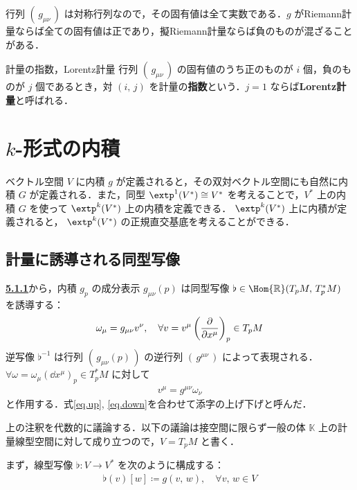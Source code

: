 \documentclass[geometry_main]{subfiles}
\begin{document}
行列 $(\, g_{\mu\nu}\, )$ は対称行列なので，その固有値は全て実数である．$g$ がRiemann計量ならば全ての固有値は正であり，擬Riemann計量ならば負のものが混ざることがある．

\begin{mydef}[label=def.matric_index]{計量の指数，Lorentz計量}
	行列 $(\, g_{\mu\nu}\, )$ の固有値のうち正のものが $i$ 個，負のものが $j$ 個であるとき，対 $(i,\, j)$ を計量の\textbf{指数}という．$j = 1$ ならば\textbf{Lorentz計量}と呼ばれる．
\end{mydef}

\section{$k$-形式の内積}

ベクトル空間 $V$ に内積 $g$ が定義されると，その双対ベクトル空間にも自然に内積 $G$ が定義される．また，同型 $\extp^1(V^*) \cong V^*$ を考えることで，$V^*$ 上の内積 $G$ を使って $\extp^k(V^*)$ 上の内積を定義できる． $\extp^k(V^*)$ 上に内積が定義されると， $\extp^k(V^*)$ の正規直交基底を考えることができる．

\subsection{計量に誘導される同型写像}

\begin{marker} 
	\textbf{\underline{5.1.1}}から，内積 $g_p$ の成分表示 $g_{\mu\nu}(p)$ は同型写像 $\flat \in \Hom{\mathbb{R}}(T_p M,\, T^*_p M)$ を誘導する：
	\begin{align} 
		\label{eq.up}
		\omega_\mu = g_{\mu\nu} v^\nu,\quad \forall v = v^\mu \left(\pdv{}{x^\mu}\right)_p \in T_p M
	\end{align}
	逆写像 $\flat^{-1}$ は行列 $(\, g_{\mu\nu}(p)\, )$ の逆行列 $(\, g^{\mu\nu}\,)$ によって表現される．$\forall \omega = \omega_\mu (\dd{x^{\mu}})_p \in T^*_p M$ に対して
	\begin{align} 
		\label{eq.down}
		v^\mu = g^{\mu \nu} \omega_{\nu}
	\end{align}
	と作用する．式\eqref{eq.up}, \eqref{eq.down}を合わせて添字の上げ下げと呼んだ．
\end{marker}

上の注釈を代数的に議論する．以下の議論は接空間に限らず一般の体 $\mathbb{K}$ 上の計量線型空間に対して成り立つので，$V = T_pM$ と書く．

まず，線型写像 $\flat \colon V \to V^*$ を次のように構成する：
\begin{align} 
	\label{eq.hom_V}
	\flat(v)[w] \coloneqq g(v,\, w),\quad \forall v,\, w \in V
\end{align}
\end{document}
